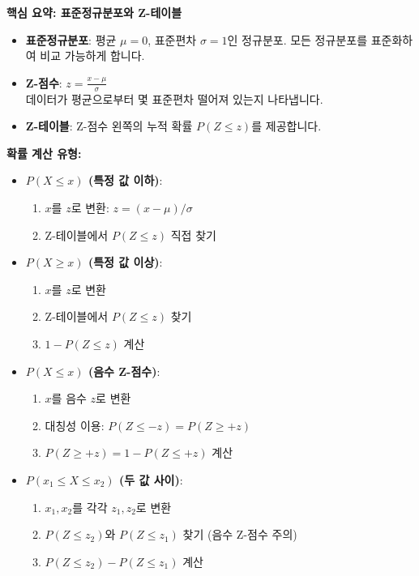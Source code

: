 \documentclass[11pt,a4paper]{book}
\theoremstyle{definition}
\begin{document}
\begin{summarybox}
\textbf{핵심 요약: 표준정규분포와 Z-테이블}
\begin{itemize}
    \item \textbf{표준정규분포}: 평균 $\mu=0$, 표준편차 $\sigma=1$인 정규분포. 모든 정규분포를 표준화하여 비교 가능하게 합니다.
    \item \textbf{Z-점수}: $z = \frac{x - \mu}{\sigma}$ \\
    데이터가 평균으로부터 몇 표준편차 떨어져 있는지 나타냅니다.
    \item \textbf{Z-테이블}: Z-점수 왼쪽의 누적 확률 $P(Z \le z)$를 제공합니다.
\end{itemize}

\textbf{확률 계산 유형:}
\begin{itemize}
    \item \textbf{$P(X \le x)$ (특정 값 이하)}:
        \begin{enumerate}
            \item $x$를 $z$로 변환: $z = (x - \mu) / \sigma$
            \item Z-테이블에서 $P(Z \le z)$ 직접 찾기
        \end{enumerate}
    \item \textbf{$P(X \ge x)$ (특정 값 이상)}:
        \begin{enumerate}
            \item $x$를 $z$로 변환
            \item Z-테이블에서 $P(Z \le z)$ 찾기
            \item $1 - P(Z \le z)$ 계산
        \end{enumerate}
    \item \textbf{$P(X \le x)$ (음수 Z-점수)}:
        \begin{enumerate}
            \item $x$를 음수 $z$로 변환
            \item 대칭성 이용: $P(Z \le -z) = P(Z \ge +z)$
            \item $P(Z \ge +z) = 1 - P(Z \le +z)$ 계산
        \end{enumerate}
    \item \textbf{$P(x_1 \le X \le x_2)$ (두 값 사이)}:
        \begin{enumerate}
            \item $x_1, x_2$를 각각 $z_1, z_2$로 변환
            \item $P(Z \le z_2)$와 $P(Z \le z_1)$ 찾기 (음수 Z-점수 주의)
            \item $P(Z \le z_2) - P(Z \le z_1)$ 계산
        \end{enumerate}
\end{itemize}


\end{summarybox}
\end{document}
